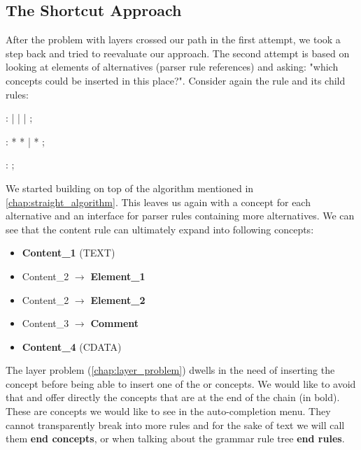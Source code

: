 \subsection{The Shortcut Approach}
\label{chap:shortcut_approach}

After the problem with layers crossed our path in the first attempt, we took a step back and tried to reevaluate our approach.
The second attempt is based on looking at elements of alternatives (parser rule references) and asking: "which concepts could be inserted in this place?".
Consider again the  rule and its child rules:

\begin{antlr}
	    :   
           |   
           |   
           |   
           ;

	    :   \literal{<}  * \literal{>} * \literal{</}  \literal{>}
           |   \literal{<}  * \literal{/>}
           ;

	    :   \literal{<!--}  \literal{-->} ;
\end{antlr}

We started building on top of the algorithm mentioned in \ref{chap:straight_algorithm}.
This leaves us again with a concept for each alternative and an interface for parser rules containing more alternatives.
We can see that the content rule can ultimately expand into following concepts:

\begin{itemize}
	\itemsep0em
	\item \textbf{Content{\_}1} (TEXT)
	\item Content{\_}2 $\rightarrow$ \textbf{Element{\_}1}
	\item Content{\_}2 $\rightarrow$ \textbf{Element{\_}2}
	\item Content{\_}3 $\rightarrow$ \textbf{Comment}
	\item \textbf{Content{\_}4} (CDATA)
\end{itemize}

The layer problem (\ref{chap:layer_problem}) dwells in the need of inserting the  concept before being able to insert one of the  or  concepts.
We would like to avoid that and offer directly the concepts that are at the end of the chain (in bold).
These are concepts we would like to see in the auto-completion menu.
They cannot transparently break into more rules and for the sake of text we will call them \textbf{end concepts}, or when talking about the grammar rule tree \textbf{end rules}.
\\


